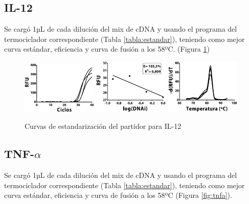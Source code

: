 \documentclass[12pt,letterpaper,oneside]{scrbook}
\begin{document}
\subsection{IL-12}

Se cargó 1µL de cada dilución del mix de cDNA y usando el programa del
termociclador correspondiente (Tabla \ref{tabla:estandar}), teniendo
como mejor curva estándar, eficiencia y curva de fusión a los 58ºC.
(Figura \ref{fig:il12})

\begin{figure}[h!]
    \centering
        {\includegraphics[width=0.32\textwidth]{standarization/il12/ampl}}
        {\includegraphics[width=0.32\textwidth]{standarization/il12/stand}}
        {\includegraphics[width=0.32\textwidth]{standarization/il12/melting}}
        \caption{Curvas de estandarización del partidor para IL-12}
        \label {fig:il12}
\end{figure}

\subsection{TNF-$\alpha$}

Se cargó 1µL de cada dilución del mix de cDNA y usando el programa del
termociclador correspondiente (Tabla \ref{tabla:estandar}), teniendo
como mejor curva estándar, eficiencia y curva de fusión a los 58ºC
(Figura \ref{fig:tnfa}).
\end{document}
